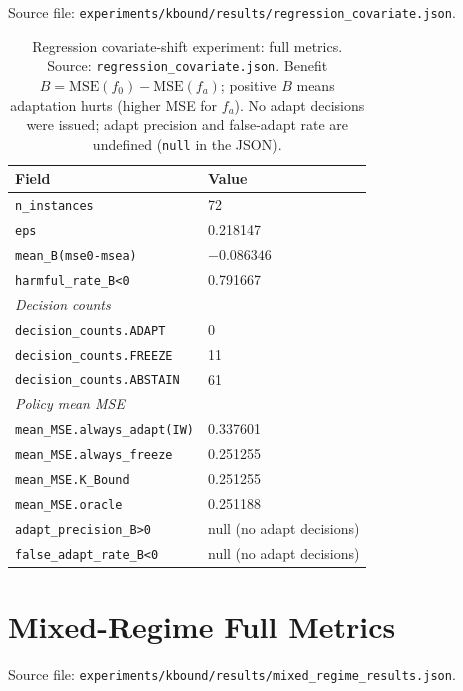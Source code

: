 Source file: \texttt{experiments/kbound/results/regression\_covariate.json}.

\begin{table}[ht]
\centering
\caption{Regression covariate-shift experiment: full metrics.
  Source: \texttt{regression\_covariate.json}.
  Benefit $B = \text{MSE}(f_0) - \text{MSE}(f_a)$; positive $B$ means adaptation hurts
  (higher MSE for $f_a$).  No adapt decisions were issued; adapt precision and
  false-adapt rate are undefined (\texttt{null} in the JSON).}
\label{tab:full-regression}
\begin{tabular}{ll}
\toprule
Field & Value \\
\midrule
\texttt{n\_instances}              & 72 \\
\texttt{eps}                       & 0.218147 \\
\texttt{mean\_B(mse0-msea)}        & $-0.086346$ \\
\texttt{harmful\_rate\_B\textless{}0} & 0.791667 \\
\midrule
\textit{Decision counts} & \\
\texttt{decision\_counts.ADAPT}    & 0 \\
\texttt{decision\_counts.FREEZE}   & 11 \\
\texttt{decision\_counts.ABSTAIN}  & 61 \\
\midrule
\textit{Policy mean MSE} & \\
\texttt{mean\_MSE.always\_adapt(IW)} & 0.337601 \\
\texttt{mean\_MSE.always\_freeze}    & 0.251255 \\
\texttt{mean\_MSE.K\_Bound}          & 0.251255 \\
\texttt{mean\_MSE.oracle}            & 0.251188 \\
\midrule
\texttt{adapt\_precision\_B>0}     & null (no adapt decisions) \\
\texttt{false\_adapt\_rate\_B\textless{}0} & null (no adapt decisions) \\
\bottomrule
\end{tabular}
\end{table}

\section{Mixed-Regime Full Metrics}
\label{sec:app-mixed}

Source file: \texttt{experiments/kbound/results/mixed\_regime\_results.json}.

